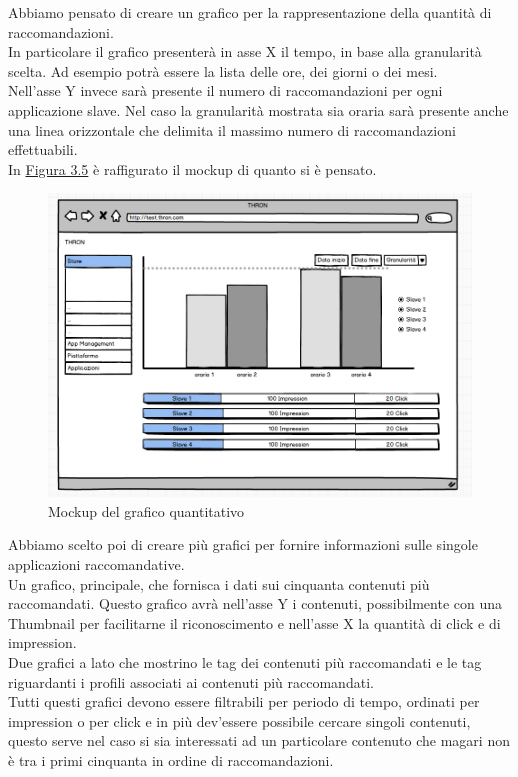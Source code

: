 \documentclass[a4paper, 12pt, twoside, openright]{book}
\begin{document}
Abbiamo pensato di creare un grafico per la rappresentazione della quantità di raccomandazioni.\\
In particolare il grafico presenterà in asse X il tempo, in base alla granularità scelta. Ad esempio potrà essere la lista delle ore, dei giorni o dei mesi.\\
Nell'asse Y invece sarà presente il numero di raccomandazioni per ogni applicazione slave. Nel caso la granularità mostrata sia oraria sarà presente anche una linea orizzontale che delimita il massimo numero di raccomandazioni effettuabili.\\
In \hyperref[grafico-quantitativo-mockup]{Figura 3.5} è raffigurato il mockup di quanto si è pensato.
\begin{figure}[H]
	\centering
	\label{grafico-quantitativo-mockup}	\includegraphics[width=1.0\textwidth]{images/grafico-quantitativo-mockup.jpg}
	\caption{Mockup del grafico quantitativo}
\end{figure} 
Abbiamo scelto poi di creare più grafici per fornire informazioni sulle singole applicazioni raccomandative.\\
Un grafico, principale, che fornisca i dati sui cinquanta contenuti più raccomandati. Questo grafico avrà nell'asse Y i contenuti, possibilmente con una Thumbnail per facilitarne il riconoscimento e nell'asse X la quantità di click e di impression.\\
Due grafici a lato che mostrino le tag dei contenuti più raccomandati e le tag riguardanti i profili associati ai contenuti più raccomandati.\\
Tutti questi grafici devono essere filtrabili per periodo di tempo, ordinati per impression o per click e in più dev'essere possibile cercare singoli contenuti, questo serve nel caso si sia interessati ad un particolare contenuto che magari non è tra i primi cinquanta in ordine di raccomandazioni.\\
\end{document}
